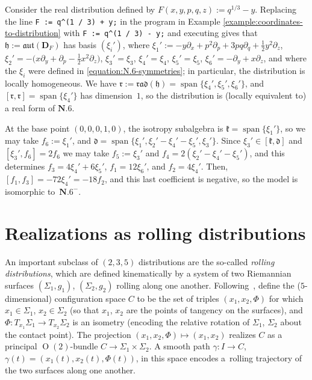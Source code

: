 \documentclass[10pt,a4paper]{amsart}
\DeclareMathOperator{\spanOperator}{span}
\newcommand{\Span}[1]{\spanOperator\{{#1}\}}
\newcommand{\mbD}{\mathbf{D}}
\newcommand{\mfd} {\mathfrak{d}}
\newcommand{\mfh} {\mathfrak{h}}
\newcommand{\mfk} {\mathfrak{k}}
\newcommand{\mfr} {\mathfrak{r}}
\newcommand{\mfaut}{\mathfrak{aut}}
\newcommand{\mfrad}{\mathfrak{rad}}
\numberwithin{equation}{section}
\begin{document}
\begin{Example}\label{example:N.6-Monge}
Consider the real distribution defined by $F(x, y, p, q, z) := q^{1 / 3} - y$. Replacing the line \texttt{F := q\^{}(1 / 3) + y;} in the program in Example \ref{example:coordinates-to-distribution} with \texttt{F := q\^{}(1 / 3) - y;} and executing gives that $\mfh := \mfaut(\mbD_F)$ has basis $(\xi_i')$, where $\xi_1' := -y \partial_x + p^2 \partial_p + 3 p q \partial_q + \frac{1}{2} y^2 \partial_z$, $\xi_2' = -\big(x \partial_y + \partial_p - \frac{1}{2} x^2 \partial_z\big)$, $\xi_3' = \xi_3$, $\xi_4' = \xi_4$, $\xi_5' = \xi_5$, $\xi_6' = -\partial_y + x \partial_z$, and where the $\xi_i$ were defined in \eqref{equation:N.6-symmetries}; in particular, the distribution is locally homogeneous. We have $\mfr := \mfrad(\mfh) = \Span{\xi_4', \xi_5', \xi_6'}$, and $[\mfr, \mfr] = \Span{\xi_4'}$ has dimension~$1$, so the distribution is (locally equivalent to) a real form of $\mathbf{N.6}$.

At the base point $(0, 0, 0, 1, 0)$, the isotropy subalgebra is $\mfk = \Span{\xi_1'}$, so we may take $f_6 := \xi_1'$, and $\mfd = \Span{\xi_1', \xi_2' - \xi_4' - \xi_5', \xi_3'}$. Since $\xi_3' \in [\mfk, \mfd]$ and $[\xi_3', f_6] = 2 f_6$ we may take $f_5 := \xi_3'$ and $f_4 = 2(\xi_2' - \xi_4' - \xi_5')$, and this determines $f_3 = 4 \xi_4' + 6 \xi_5'$, $f_1 = 12 \xi_6'$, and $f_2 = 4 \xi_4'$. Then, $[f_1, f_3] = -72 \xi_4' = -18 f_2$, and this last coefficient is negative, so the model is isomorphic to~$\mathbf{N.6}^-$.
\end{Example}

\section{Realizations as rolling distributions}\label{section:rolling}

An important subclass of $(2, 3, 5)$ distributions are the so-called \textit{rolling distributions}, which are defined kinematically by a system of two Riemannian surfaces $(\Sigma_1, g_1)$, $(\Sigma_2, g_2)$ rolling along one another. Following~\cite{BryantHsu}, define the ($5$-dimensional) configuration space $C$ to be the set of triples $(x_1, x_2, \Phi)$ for which $x_1 \in \Sigma_1$, $x_2 \in \Sigma_2$ (so that $x_1$, $x_2$ are the points of tangency on the surfaces), and $\Phi\colon T_{x_1} \Sigma_1 \to T_{x_2} \Sigma_2$ is an isometry (encoding the relative rotation of $\Sigma_1$, $\Sigma_2$ about the contact point). The projection $(x_1, x_2, \Phi) \mapsto (x_1, x_2)$ realizes $C$ as a principal $\operatorname{O}(2)$-bundle $C \to \Sigma_1 \times \Sigma_2$. A smooth path $\gamma\colon I \to C$, $\gamma(t) = (x_1(t), x_2(t), \Phi(t))$, in this space encodes a~rolling trajectory of the two surfaces along one another.
\end{document}
